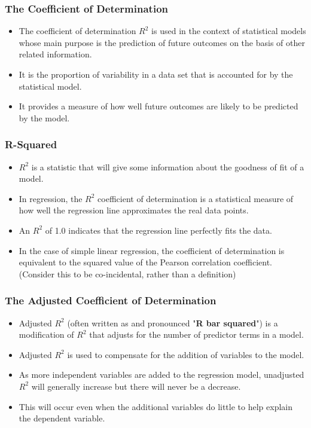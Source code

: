 \documentclass[PredictiveAnalytics101.tex]{subfiles}
\begin{document}
 

\begin{frame}
	\frametitle{The Coefficient of Determination}
	\Large
	\begin{itemize}
		\item The coefficient of determination $R^2$ is used in the context of statistical models whose main purpose is the prediction of future outcomes on the basis of other related information. 
		\item It is the proportion of variability in a data set that is accounted for by the statistical model. 
		\item It provides a measure of how well future outcomes are likely to be predicted by the model.
	\end{itemize}
\end{frame}

\begin{frame}
	\frametitle{R-Squared}
	\Large
	\begin{itemize}
		\item $R^2$ is a statistic that will give some information about the goodness of fit of a model.
		\item In regression, the $R^2$ coefficient of determination is a statistical measure of how well the regression line approximates the real data points.
		\item An $R^2$ of 1.0 indicates that the regression line perfectly fits the data.
		
		\item In the case of simple linear regression, the coefficient of determination is equivalent to the squared value of the Pearson correlation coefficient. (Consider this to be co-incidental, rather than a definition)
	\end{itemize}
	
\end{frame}
\begin{frame}
	\frametitle{The Adjusted Coefficient of Determination}
	\Large
	\begin{itemize}
		\item Adjusted $R^2$ (often written as and pronounced "\textbf{R bar squared}") is a modification of $R^2$ that adjusts for the number of predictor terms in a model.
		\item  Adjusted $R^2$ is used to compensate for the addition of variables to the model. 
		\item As more independent variables are added to the regression model, unadjusted $R^2$ will generally increase but there will never be a decrease.  
		\item This will occur even when the additional variables do little to help explain the dependent variable.
	\end{itemize}  
\end{frame}
\end{document}
